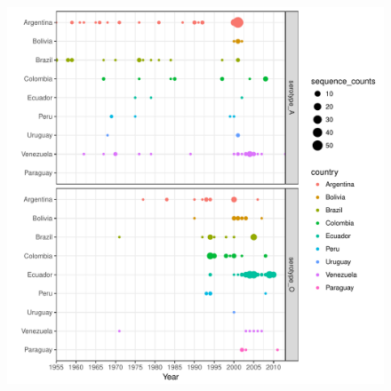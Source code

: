 \documentclass[a4paper,10pt]{article}
\begin{document}
\newpage
\begin{center}
\begin{figure}[H]
\begin{center}
\includegraphics[scale=.75]{FIGURES/PLOTS/sampling_bubble_plot.pdf}
\end{center}
\caption{}
\label{sfig:sampling}
\end{figure}
\end{center}
\end{document}
